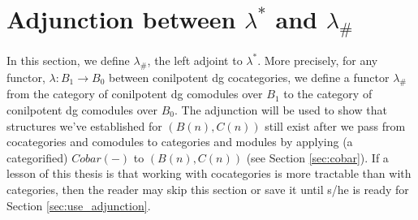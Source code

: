 \section{Adjunction between $\lambda^*$ and $\lambda_\#$}
In this section, we define $\lambda_\#$, 
the left adjoint to $\lambda^*$. 
More precisely, for any functor, $\lambda:
B_1 \to B_0$ between 
conilpotent dg cocategories, 
we define a functor 
$\lambda_\#$ from the category of 
conilpotent dg comodules 
over $B_1$ to the category of 
conilpotent dg 
comodules over $B_0$.
The adjunction will be used to show 
that structures we've established 
for $(B(n), C(n))$ still exist 
after we pass from cocategories and 
comodules to categories and modules
by applying (a categorified) $Cobar(-)$ 
to $(B(n), C(n))$ (see Section 
\ref{sec:cobar}). If a lesson 
of this thesis is that working with
cocategories is more tractable 
than with categories, then the reader 
may skip this section or save it until 
s/he is ready for Section 
\ref{sec:use_adjunction}.
%

%
